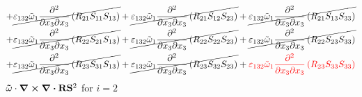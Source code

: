 \begin{equation}
\begin{split}
		+\cancel{\varepsilon_{132}\tilde{\omega}_{1}\pdv{}{x_{3}}{x_{3}}\left(R_{21}S_{11}S_{13}\right)}
		+\cancel{\varepsilon_{132}\tilde{\omega}_{1}\pdv{}{x_{3}}{x_{3}}\left(R_{21}S_{12}S_{23}\right)}
		+\cancel{\varepsilon_{132}\tilde{\omega}_{1}\pdv{}{x_{3}}{x_{3}}\left(R_{21}S_{13}S_{33}\right)}\\
		+\cancel{\varepsilon_{132}\tilde{\omega}_{1}\pdv{}{x_{3}}{x_{3}}\left(R_{22}S_{21}S_{13}\right)}
		+\cancel{\varepsilon_{132}\tilde{\omega}_{1}\pdv{}{x_{3}}{x_{3}}\left(R_{22}S_{22}S_{23}\right)}
		+\cancel{\varepsilon_{132}\tilde{\omega}_{1}\pdv{}{x_{3}}{x_{3}}\left(R_{22}S_{23}S_{33}\right)}\\
		+\cancel{\varepsilon_{132}\tilde{\omega}_{1}\pdv{}{x_{3}}{x_{3}}\left(R_{23}S_{31}S_{13}\right)}
		+\cancel{\varepsilon_{132}\tilde{\omega}_{1}\pdv{}{x_{3}}{x_{3}}\left(R_{23}S_{32}S_{23}\right)}
		+{\color{red}\varepsilon_{132}\tilde{\omega}_{1}\pdv{}{x_{3}}{x_{3}}\left(R_{23}S_{33}S_{33}\right)}\\
	\end{split}
\end{equation}
$\mathbf{\tilde{\omega}}\cdot\curl \div \mathbf{R} \mathbf{S}^2$ for $i=2$
